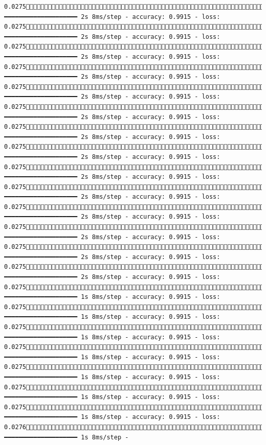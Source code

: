 \documentclass[
  letterpaper,
  DIV=11,
  numbers=noendperiod]{scrreprt}
\begin{document}
\begin{verbatim}
0.02751518/1875 ━━━━━━━━━━━━━━━━━━━━ 2s 8ms/step - accuracy: 0.9915 - loss: 0.02751526/1875 ━━━━━━━━━━━━━━━━━━━━ 2s 8ms/step - accuracy: 0.9915 - loss: 0.02751534/1875 ━━━━━━━━━━━━━━━━━━━━ 2s 8ms/step - accuracy: 0.9915 - loss: 0.02751541/1875 ━━━━━━━━━━━━━━━━━━━━ 2s 8ms/step - accuracy: 0.9915 - loss: 0.02751549/1875 ━━━━━━━━━━━━━━━━━━━━ 2s 8ms/step - accuracy: 0.9915 - loss: 0.02751556/1875 ━━━━━━━━━━━━━━━━━━━━ 2s 8ms/step - accuracy: 0.9915 - loss: 0.02751564/1875 ━━━━━━━━━━━━━━━━━━━━ 2s 8ms/step - accuracy: 0.9915 - loss: 0.02751571/1875 ━━━━━━━━━━━━━━━━━━━━ 2s 8ms/step - accuracy: 0.9915 - loss: 0.02751578/1875 ━━━━━━━━━━━━━━━━━━━━ 2s 8ms/step - accuracy: 0.9915 - loss: 0.02751585/1875 ━━━━━━━━━━━━━━━━━━━━ 2s 8ms/step - accuracy: 0.9915 - loss: 0.02751592/1875 ━━━━━━━━━━━━━━━━━━━━ 2s 8ms/step - accuracy: 0.9915 - loss: 0.02751599/1875 ━━━━━━━━━━━━━━━━━━━━ 2s 8ms/step - accuracy: 0.9915 - loss: 0.02751606/1875 ━━━━━━━━━━━━━━━━━━━━ 2s 8ms/step - accuracy: 0.9915 - loss: 0.02751613/1875 ━━━━━━━━━━━━━━━━━━━━ 2s 8ms/step - accuracy: 0.9915 - loss: 0.02751620/1875 ━━━━━━━━━━━━━━━━━━━━ 1s 8ms/step - accuracy: 0.9915 - loss: 0.02751628/1875 ━━━━━━━━━━━━━━━━━━━━ 1s 8ms/step - accuracy: 0.9915 - loss: 0.02751635/1875 ━━━━━━━━━━━━━━━━━━━━ 1s 8ms/step - accuracy: 0.9915 - loss: 0.02751642/1875 ━━━━━━━━━━━━━━━━━━━━ 1s 8ms/step - accuracy: 0.9915 - loss: 0.02751650/1875 ━━━━━━━━━━━━━━━━━━━━ 1s 8ms/step - accuracy: 0.9915 - loss: 0.02751657/1875 ━━━━━━━━━━━━━━━━━━━━ 1s 8ms/step - accuracy: 0.9915 - loss: 0.02751664/1875 ━━━━━━━━━━━━━━━━━━━━ 1s 8ms/step - accuracy: 0.9915 - loss: 0.02761672/1875 ━━━━━━━━━━━━━━━━━━━━ 1s 8ms/step - 
\end{verbatim}
\end{document}
